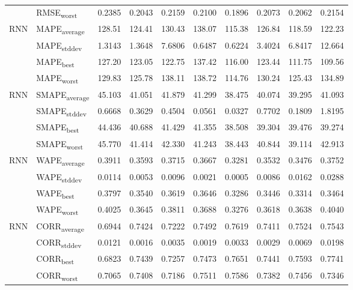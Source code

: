 {\begin{longtable}{l l c c c c c c c c}
 & RMSE\textsubscript{worst} & 0.2385 & 0.2043 & 0.2159 & 0.2100 & 0.1896 & 0.2073 & 0.2062 & 0.2154 \\
\cmidrule(lr){2-10}
\multirow{4}{*}{RNN} & MAPE\textsubscript{average} & 128.51 & 124.41 & 130.43 & 138.07 & 115.38 & 126.84 & 118.59 & 122.23 \\
 & MAPE\textsubscript{stddev} & 1.3143 & 1.3648 & 7.6806 & 0.6487 & 0.6224 & 3.4024 & 6.8417 & 12.664 \\
 & MAPE\textsubscript{best} & 127.20 & 123.05 & 122.75 & 137.42 & 116.00 & 123.44 & 111.75 & 109.56 \\
 & MAPE\textsubscript{worst} & 129.83 & 125.78 & 138.11 & 138.72 & 114.76 & 130.24 & 125.43 & 134.89 \\
\cmidrule(lr){2-10}
\multirow{4}{*}{RNN} & SMAPE\textsubscript{average} & 45.103 & 41.051 & 41.879 & 41.299 & 38.475 & 40.074 & 39.295 & 41.093 \\
 & SMAPE\textsubscript{stddev} & 0.6668 & 0.3629 & 0.4504 & 0.0561 & 0.0327 & 0.7702 & 0.1809 & 1.8195 \\
 & SMAPE\textsubscript{best} & 44.436 & 40.688 & 41.429 & 41.355 & 38.508 & 39.304 & 39.476 & 39.274 \\
 & SMAPE\textsubscript{worst} & 45.770 & 41.414 & 42.330 & 41.243 & 38.443 & 40.844 & 39.114 & 42.913 \\
\cmidrule(lr){2-10}
\multirow{4}{*}{RNN} & WAPE\textsubscript{average} & 0.3911 & 0.3593 & 0.3715 & 0.3667 & 0.3281 & 0.3532 & 0.3476 & 0.3752 \\
 & WAPE\textsubscript{stddev} & 0.0114 & 0.0053 & 0.0096 & 0.0021 & 0.0005 & 0.0086 & 0.0162 & 0.0288 \\
 & WAPE\textsubscript{best} & 0.3797 & 0.3540 & 0.3619 & 0.3646 & 0.3286 & 0.3446 & 0.3314 & 0.3464 \\
 & WAPE\textsubscript{worst} & 0.4025 & 0.3645 & 0.3811 & 0.3688 & 0.3276 & 0.3618 & 0.3638 & 0.4040 \\
\cmidrule(lr){2-10}
\multirow{4}{*}{RNN} & CORR\textsubscript{average} & 0.6944 & 0.7424 & 0.7222 & 0.7492 & 0.7619 & 0.7411 & 0.7524 & 0.7543 \\
 & CORR\textsubscript{stddev} & 0.0121 & 0.0016 & 0.0035 & 0.0019 & 0.0033 & 0.0029 & 0.0069 & 0.0198 \\
 & CORR\textsubscript{best} & 0.6823 & 0.7439 & 0.7257 & 0.7473 & 0.7651 & 0.7441 & 0.7593 & 0.7741 \\
 & CORR\textsubscript{worst} & 0.7065 & 0.7408 & 0.7186 & 0.7511 & 0.7586 & 0.7382 & 0.7456 & 0.7346 \\

\end{longtable}}
